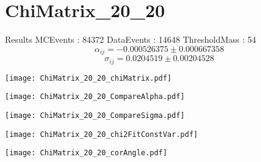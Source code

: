 \documentclass[a4paper,12pt]{article}
\begin{document}
\section{ChiMatrix\_20\_20}
\begin{minipage}{0.49\linewidth} Results \newline
MCEvents : 84372\newline
DataEvents : 14648 \newline
ThresholdMass : 54\\
$$\alpha_{ij} = -0.000526375\pm 0.000667358$$
$$\sigma_{ij} = 0.0204519\pm 0.00204528$$
\end{minipage}\hfill
\begin{minipage}{0.49\linewidth} 
\texttt{[image: ChiMatrix\_20\_20\_chiMatrix.pdf]}\\
\end{minipage}
\hfill
\begin{minipage}{0.49\linewidth} 
\texttt{[image: ChiMatrix\_20\_20\_CompareAlpha.pdf]}\\
\end{minipage}
\hfill
\begin{minipage}{0.49\linewidth} 
\texttt{[image: ChiMatrix\_20\_20\_CompareSigma.pdf]}\\
\end{minipage}
\begin{minipage}{0.49\linewidth} 
\texttt{[image: ChiMatrix\_20\_20\_chi2FitConstVar.pdf]}\\
\end{minipage}
\hfill
\begin{minipage}{0.49\linewidth} 
\texttt{[image: ChiMatrix\_20\_20\_corAngle.pdf]}\\
\end{minipage}
\end{document}
